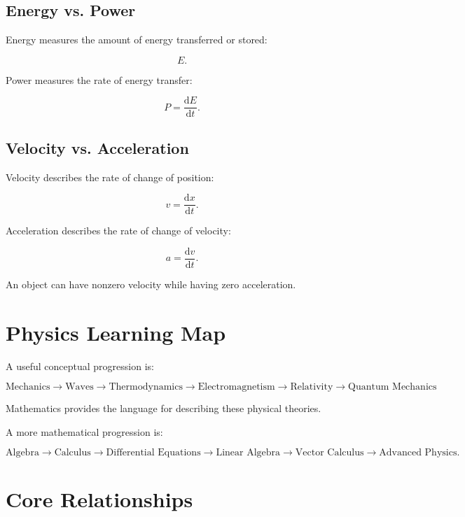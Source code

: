 \documentclass[11pt,a4paper]{article}
\newcommand{\dd}{\mathrm{d}}
\begin{document}
\subsection{Energy vs. Power}

Energy measures the amount of energy transferred or stored:

\[
E.
\]

Power measures the rate of energy transfer:

\[
P=\frac{\dd E}{\dd t}.
\]

\subsection{Velocity vs. Acceleration}

Velocity describes the rate of change of position:

\[
v=\frac{\dd x}{\dd t}.
\]

Acceleration describes the rate of change of velocity:

\[
a=\frac{\dd v}{\dd t}.
\]

An object can have nonzero velocity while having zero acceleration.

\section{Physics Learning Map}

A useful conceptual progression is:

\[
\boxed{
\text{Mechanics}
\rightarrow
\text{Waves}
\rightarrow
\text{Thermodynamics}
\rightarrow
\text{Electromagnetism}
\rightarrow
\text{Relativity}
\rightarrow
\text{Quantum Mechanics}
}
\]

Mathematics provides the language for describing these physical theories.

A more mathematical progression is:

\[
\text{Algebra}
\rightarrow
\text{Calculus}
\rightarrow
\text{Differential Equations}
\rightarrow
\text{Linear Algebra}
\rightarrow
\text{Vector Calculus}
\rightarrow
\text{Advanced Physics}.
\]

\section{Core Relationships}
\end{document}
